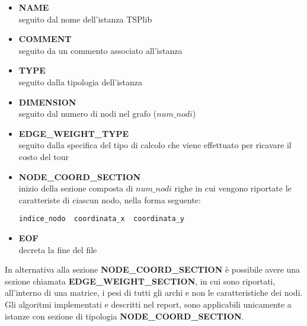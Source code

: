 \begin{itemize}
\item{\textbf{NAME}\\
seguito dal nome dell'istanza TSPlib}
\item{\textbf{COMMENT}\\
seguito da un commento associato all'istanza}
\item{\textbf{TYPE}\\
seguito dalla tipologia dell'istanza}
\item{\textbf{DIMENSION}\\
seguito dal numero di nodi nel grafo ($num\_nodi$)}
\item{\textbf{EDGE\_WEIGHT\_TYPE}\\
seguito dalla specifica del tipo di calcolo che viene effettuato per ricavare il costo del tour}
\item{\textbf{NODE\_COORD\_SECTION}\\
inizio della sezione composta di $num\_nodi$ righe in cui vengono riportate le caratteriste di ciascun nodo, nella forma seguente:
\begin{lstlisting}[linewidth=250pt,basicstyle=\footnotesize\sffamily,]     
indice_nodo  coordinata_x  coordinata_y
\end{lstlisting}}
\item{\textbf{EOF}\\
decreta la fine del file}
\end{itemize}
In alternativa alla sezione \textbf{NODE\_COORD\_SECTION} è possibile avere una sezione chiamata
\textbf{EDGE\_WEIGHT\_SECTION}, in cui sono riportati, all'interno di una matrice, i pesi di tutti gli archi e non le caratteristiche dei nodi. Gli algoritmi implementati e descritti nel report, sono applicabili unicamente a istanze con sezione di tipologia \textbf{NODE\_COORD\_SECTION}.